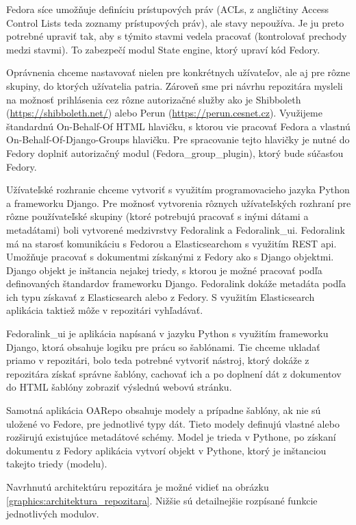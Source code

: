 \documentclass[thesis=M,slovak]{FITthesis}[2013/05/06]
\begin{document}
Fedora síce umožňuje definíciu prístupových práv (ACLs, z angličtiny Access Control Lists teda zoznamy prístupových práv), ale stavy nepoužíva. Je ju preto potrebné upraviť tak, aby s týmito stavmi vedela pracovať (kontrolovať prechody medzi stavmi). To zabezpečí modul State engine, ktorý upraví kód Fedory.

Oprávnenia chceme nastavovať nielen pre konkrétnych užívateľov, ale aj pre rôzne skupiny, do ktorých užívatelia patria. Zároveň sme pri návrhu repozitára mysleli na možnosť prihlásenia cez rôzne autorizačné služby ako je Shibboleth (\url{https://shibboleth.net/}) alebo Perun (\url{https://perun.cesnet.cz}). Využijeme štandardnú On-Behalf-Of HTML hlavičku, s ktorou vie pracovať Fedora a vlastnú On-Behalf-Of-Django-Groups hlavičku. Pre spracovanie tejto hlavičky je nutné do Fedory doplniť autorizačný modul (Fedora\_group\_plugin), ktorý bude súčasťou Fedory.

Užívateľské rozhranie chceme vytvoriť s využitím programovacieho jazyka Python a frameworku Django. Pre možnosť vytvorenia rôznych užívateľských rozhraní pre rôzne používateľské skupiny (ktoré potrebujú pracovať s inými dátami a metadátami) boli vytvorené medzivrstvy Fedoralink a Fedoralink\_ui. Fedoralink má na starosť komunikáciu s Fedorou a Elasticsearchom s využitím REST api. Umožňuje pracovať s dokumentmi získanými z Fedory ako s Django objektmi. Django objekt je inštancia nejakej triedy, s ktorou je možné pracovať podľa definovaných štandardov frameworku Django. Fedoralink dokáže metadáta podľa ich typu získavať z Elasticsearch alebo z Fedory. S využitím Elasticsearch aplikácia taktiež môže v repozitári vyhľadávať.

Fedoralink\_ui je aplikácia napísaná v jazyku Python s využitím frameworku Django, ktorá obsahuje logiku pre prácu so šablónami. Tie chceme ukladať priamo v repozitári, bolo teda potrebné vytvoriť nástroj, ktorý dokáže z repozitára získať správne šablóny, cachovať ich a po doplnení dát z dokumentov do HTML šablóny zobraziť výslednú webovú stránku.

Samotná aplikácia OARepo obsahuje modely a prípadne šablóny, ak nie sú uložené vo Fedore, pre jednotlivé typy dát. Tieto modely definujú vlastné alebo rozširujú existujúce metadátové schémy. Model je trieda v Pythone, po získaní dokumentu z Fedory aplikácia vytvorí objekt v Pythone, ktorý je inštanciou takejto triedy (modelu).

Navrhnutú architektúru repozitára je možné vidieť na obrázku \ref{graphics:architektura_repozitara}. Nižšie sú detailnejšie rozpísané funkcie jednotlivých modulov.
\end{document}
